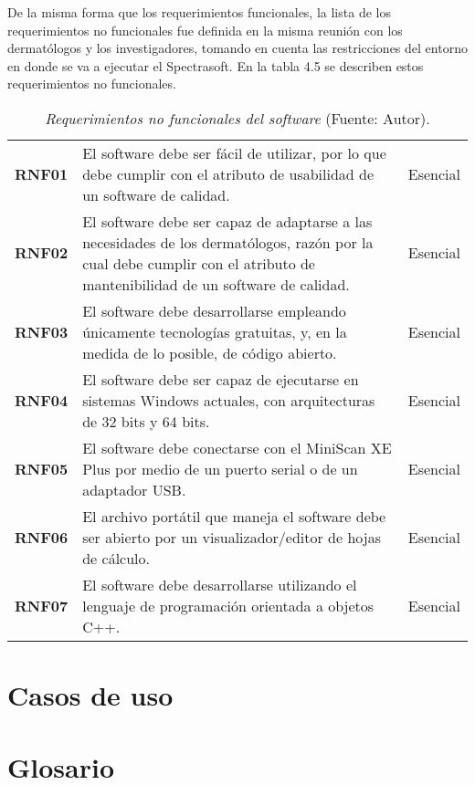 	De la misma forma que los requerimientos funcionales, la lista de los requerimientos no funcionales fue definida en la misma reuni\'{o}n con los dermat\'{o}logos y los investigadores, tomando en cuenta las restricciones del entorno en donde se va a ejecutar el Spectrasoft. En la tabla 4.5 se describen estos requerimientos no funcionales.
	
	\begin{table}[h]
		\small
		\caption[Requerimientos no funcionales del software]{\textit{Requerimientos no funcionales del software} (Fuente: Autor).}
		\centering
		\setlength{\extrarowheight}{\altocelda}
		\begin{tabulary}{\anchotabla}{|c|J|c|}
			\hline
			 &  & \\ \hline
			\textbf{RNF01} & El software debe ser f\'{a}cil de utilizar, por lo que debe cumplir con el atributo de usabilidad de un software de calidad. & Esencial\\ \hline
			\textbf{RNF02} & El software debe ser capaz de adaptarse a las necesidades de los dermat\'{o}logos, raz\'{o}n por la cual debe cumplir con el atributo de mantenibilidad de un software de calidad. & Esencial\\ \hline
			\textbf{RNF03} & El software debe desarrollarse empleando \'{u}nicamente tecnolog\'{i}as gratuitas, y, en la medida de lo posible, de c\'{o}digo abierto. & Esencial\\ \hline
			\textbf{RNF04} & El software debe ser capaz de ejecutarse en sistemas Windows actuales, con arquitecturas de 32 bits y 64 bits. & Esencial\\ \hline
			\textbf{RNF05} & El software debe conectarse con el MiniScan XE Plus por medio de un puerto serial o de un adaptador USB. & Esencial\\ \hline
			\textbf{RNF06} & El archivo port\'{a}til que maneja el software debe ser abierto por un visualizador/editor de hojas de c\'{a}lculo. & Esencial\\ \hline
			\textbf{RNF07} & El software debe desarrollarse utilizando el lenguaje de programaci\'{o}n orientada a objetos C++. & Esencial\\ \hline
		\end{tabulary}
	\end{table}

\section{Casos de uso}

\section{Glosario}
